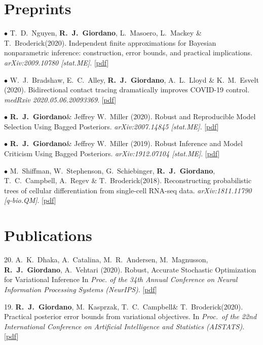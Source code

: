 \documentclass[margin,line]{res}
\newcommand{\me}{\textbf{R.~J.~Giordano}\xspace}
\newcommand{\trevor}{T.~C.~Campbell\xspace}
\newcommand{\tamara}{T.~Broderick\xspace}
\newcommand{\paperref}[1]{[\href{#1}{pdf}]}
\newcommand{\paperref}[1]{}
\begin{document}
\begin{resume}

\section{\sc Preprints}

$\bullet$ T.~D.~Nguyen, \me, L.~Masoero, L.~Mackey \& \tamara (2020).
Independent finite approximations for Bayesian nonparametric inference: construction, error bounds, and practical implications.
\emph{arXiv:2009.10780 [stat.ME]}.
\paperref{https://arxiv.org/abs/2009.10780}

$\bullet$ W.\ J.\ Bradshaw, E.\ C.\ Alley, \me, A.\ L.\ Lloyd \& K.\ M.\ Esvelt (2020).
Bidirectional contact tracing dramatically improves COVID-19 control.
\emph{medRxiv 2020.05.06.20093369}.
\paperref{https://doi.org/10.1101/2020.05.06.20093369}

$\bullet$ \me \& Jeffrey W.~Miller (2020).
Robust and Reproducible Model Selection Using Bagged Posteriors.
\emph{arXiv:2007.14845 [stat.ME]}.
\paperref{https://arxiv.org/abs/2007.14845}

$\bullet$ \me \& Jeffrey W.~Miller (2019).
Robust Inference and Model Criticism Using Bagged Posteriors.
\emph{arXiv:1912.07104 [stat.ME]}.
\paperref{https://arxiv.org/abs/1912.07104}

$\bullet$ M.~Shiffman, W.~Stephenson, G.~Schiebinger,  \me,  \trevor, A.~Regev \& \tamara  (2018).
Reconstructing probabilistic trees of cellular differentiation from single-cell RNA-seq data.
\emph{arXiv:1811.11790 [q-bio.QM]}.
\paperref{https://arxiv.org/abs/1811.1179}



\section{\sc Publications}

20. A.~K.~Dhaka, A.~Catalina, M.~R.~Andersen, M.~Magnusson, \me, A.~Vehtari (2020).
Robust, Accurate Stochastic Optimization for Variational Inference
In \emph{Proc. of the 34th Annual Conference on Neural Information Processing Systems (NeurIPS)}.
\paperref{https://arxiv.org/abs/2009.00666}

19. \me, M.~Kasprzak, \trevor \& \tamara (2020).
Practical posterior error bounds from variational objectives.
In \emph{Proc.~of the 22nd International Conference on Artificial Intelligence and Statistics (AISTATS)}.
\paperref{https://arxiv.org/abs/1910.04102}


\end{resume}
\end{document}
